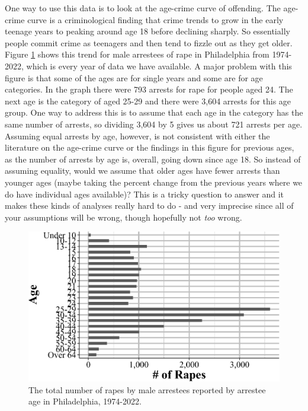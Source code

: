 \documentclass[
  12pt,
  openany]{book}
\begin{document}
One way to use this data is to look at the age-crime curve of offending. The age-crime curve is a criminological finding that crime trends to grow in the early teenage years to peaking around age 18 before declining sharply. So essentially people commit crime as teenagers and then tend to fizzle out as they get older. Figure \ref{fig:phillyRapeAge} shows this trend for male arrestees of rape in Philadelphia from 1974-2022, which is every year of data we have available. A major problem with this figure is that some of the ages are for single years and some are for age categories. In the graph there were 793 arrests for rape for people aged 24. The next age is the category of aged 25-29 and there were 3,604 arrests for this age group. One way to address this is to assume that each age in the category has the same number of arrests, so dividing 3,604 by 5 gives us about 721 arrests per age. Assuming equal arrests by age, however, is not consistent with either the literature on the age-crime curve or the findings in this figure for previous ages, as the number of arrests by age is, overall, going down since age 18. So instead of assuming equality, would we assume that older ages have fewer arrests than younger ages (maybe taking the percent change from the previous years where we do have individual ages available)? This is a tricky question to answer and it makes these kinds of analyses really hard to do - and very imprecise since all of your assumptions will be wrong, though hopefully not \emph{too} wrong.

\begin{figure}

{\centering \includegraphics[width=0.9\linewidth]{05_arrests_files/figure-latex/phillyRapeAge-1} 

}

\caption{The total number of rapes by male arrestees reported by arrestee age in Philadelphia, 1974-2022.}\label{fig:phillyRapeAge}
\end{figure}
\end{document}
